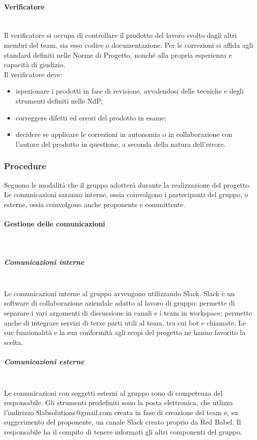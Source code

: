 			\paragraph{Verificatore} \mbox{}\\
			Il verificatore si occupa di controllare il prodotto del lavoro svolto dagli altri membri del team, sia esso codice o documentazione. Per le correzioni si affida agli standard definiti nelle Norme di Progetto, nonché alla propria esperienza e capacità di giudizio.\\
			Il verificatore deve:
			\begin{itemize}
				\item ispezionare i prodotti in fase di revisione, avvalendosi delle tecniche e degli strumenti definiti nelle NdP;
				\item correggere difetti ed errori del prodotto in esame;
				\item decidere se applicare le correzioni in autonomia o in collaborazione con l'autore del prodotto in questione, a seconda della natura dell'errore.
			\end{itemize}
		\subsubsection{Procedure}
		Seguono le modalità che il gruppo adotterà durante la realizzazione del progetto. Le comunicazioni saranno interne, ossia coinvolgono i partecipanti del gruppo, o esterne, ossia coinvolgono anche proponente e committente.
			\paragraph{Gestione delle comunicazioni} \mbox{}\\
			\subparagraph{Comunicazioni interne} \mbox{}\\
			Le comunicazioni interne al gruppo avvengono utilizzando Slack. Slack è un software di collaborazione aziendale adatto al lavoro di gruppo: permette di separare i vari argomenti di discussione in canali e i team in workspace; permette anche di integrare servizi di terze parti utili al team, tra cui bot e chiamate. Le sue funzionalità e la sua conformità agli scopi del progetto ne hanno favorito la scelta.
			\subparagraph{Comunicazioni esterne} \mbox{}\\
			Le comunicazioni con soggetti esterni al gruppo sono di competenza del responsabile. Gli strumenti predefiniti sono la posta elettronica, che utlizza l'indirizzo 8labsolutions@gmail.com creata in fase di creazione del team e, su suggerimento del proponente, un canale Slack creato proprio da Red Babel. Il responsabile ha il compito di tenere informati gli altri componenti del gruppo.
